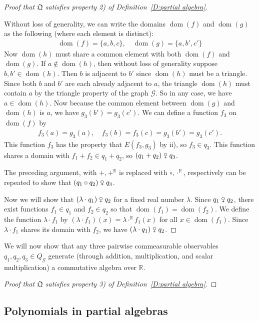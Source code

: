 \documentclass{scrartcl}
\DeclareMathOperator{\dom}{dom}
\newcommand{\SG}{\mathscr{G}}
\newcommand{\BR}{\mathbb{R}}
\newcommand{\com}{\mathrel{\venus}}
\begin{document}
\begin{proof}[Proof that $\mathfrak{Q}$ satisfies property 2) of Definition~\ref{D:partial algebra}]
\begin{enumerate}
Without loss of generality, we can write the domains $\dom(f)$ and $\dom(g)$ as the following (where each element is distinct):
\begin{align*}
\dom(f)=\{a,b,c\},\quad\dom(g)=\{a,b',c'\}
\end{align*}
Now $\dom(h)$ must share a common element with both $\dom(f)$ and $\dom(g)$. If $a\notin\dom(h)$, then without loss of generality suppose $b,b'\in\dom(h)$. Then $b$ is adjacent to $b'$ since $\dom(h)$ must be a triangle. Since both $b$ and $b'$ are each already adjacent to $a$, the triangle $\dom(h)$ must contain $a$ by the triangle property of the graph $\SG$. So in any case, we have $a\in\dom(h)$. Now because the common element between $\dom(g)$ and $\dom(h)$ is $a$, we have $g_3(b')=g_3(c')$. We can define a function $f_3$ on $\dom(f)$ by
\begin{align*}
f_3(a)=g_3(a),\quad f_3(b)=f_3(c)=g_3(b')=g_3(c').
\end{align*}
This function $f_3$ has the property that $E(f_3,g_3)$ by ii), so $f_3\in q_3$. This function shares a domain with $f_1+f_2\in q_1+q_2$, so $(q_1+q_2)\com q_3$.
\end{enumerate}

The preceding argument, with $+,+^{\BR}$ is replaced with $\circ,\cdot^{\BR}$, respectively can be repeated to show that $(q_1\circ q_2)\com q_3$.

Now we will show that $(\lambda\cdot q_1)\com q_2$ for a fixed real number $\lambda$. Since $q_1\com q_2$, there exist functions $f_1\in q_1$ and $f_2\in q_2$ so that $\dom(f_1)=\dom(f_2)$. We define the function $\lambda\cdot f_1$ by $(\lambda\cdot f_1)(x)=\lambda\cdot^{\BR}f_1(x)$ for all $x\in\dom(f_1)$. Since $\lambda\cdot f_1$ shares its domain with $f_2$, we have $(\lambda\cdot q_1)\com q_2$.
\end{proof}

We will now show that any three pairwise commeasurable observables $q_1,q_2,q_3\in Q_{\SG}$ generate (through addition, multiplication, and scalar multiplication) a commutative algebra over $\BR$.


\begin{proof}[Proof that $\mathfrak{Q}$ satisfies property 3) of Definition~\ref{D:partial algebra}] 


\end{proof}






\subsection{Polynomials in partial algebras}
\end{document}
